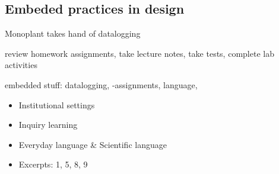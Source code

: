 \subsection{Embeded practices in design}
Monoplant takes hand of datalogging

review homework assignments, take lecture notes, take tests, complete lab activities

embedded stuff: datalogging, -assignments, language,

\begin{itemize}
\item{Institutional settings}
\item{Inquiry learning}
\item{Everyday language \& Scientific language}
\item{Excerpts: 1, 5, 8, 9}
\end{itemize}
